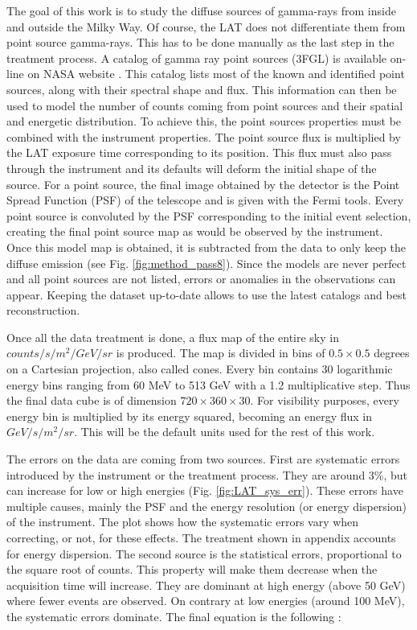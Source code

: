 The goal of this work is to study the diffuse sources of gamma-rays from inside and outside the Milky Way. Of course, the LAT does not differentiate them from point source gamma-rays. This has to be done manually as the last step in the treatment process. A catalog of gamma ray point sources (3FGL) is available on-line on NASA website \cite{3FGL2015}. This catalog lists most of the known and identified point sources, along with their spectral shape and flux. This information can then be used to model the number of counts coming from point sources and their spatial and energetic distribution. To achieve this, the point sources properties must be combined with the instrument properties. The point source flux is multiplied by the LAT exposure time corresponding to its position. This flux must also pass through the instrument and its defaults will deform the initial shape of the source. For a point source, the final image obtained by the detector is the Point Spread Function (PSF) of the telescope and is given with the Fermi tools. Every point source is convoluted by the PSF corresponding to the initial event selection, creating the final point source map as would be observed by the instrument.
Once this model map is obtained, it is subtracted from the data to only keep the diffuse emission (see Fig. \ref{fig:method_pass8}). Since the models are never perfect and all point sources are not listed, errors or anomalies in the observations can appear. Keeping the dataset up-to-date allows to use the latest catalogs and best reconstruction.


Once all the data treatment is done, a flux map of the entire sky in $counts/s/m^2/GeV/sr$ is produced. The map is divided in bins of $0.5 \times 0.5$ degrees on a Cartesian projection, also called cones. Every bin contains 30 logarithmic energy bins ranging from 60 MeV to 513 GeV with a 1.2 multiplicative step. Thus the final data cube is of dimension $720 \times 360 \times 30$. For visibility purposes, every energy bin is multiplied by its energy squared, becoming an energy flux in $GeV/s/m^2/sr$. This will be the default units used for the rest of this work.

The errors on the data are coming from two sources. First are systematic errors introduced by the instrument or the treatment process. They are around 3\%, but can increase for low or high energies (Fig. \ref{fig:LAT_sys_err}). These errors have multiple causes, mainly the PSF and the energy resolution (or energy dispersion) of the instrument. The plot shows how the systematic errors vary when correcting, or not, for these effects. The treatment shown in appendix accounts for energy dispersion.
The second source is the statistical errors, proportional to the square root of counts. This property will make them decrease when the acquisition time will increase. They are dominant at high energy (above 50 GeV) where fewer events are observed. On contrary at low energies (around 100 MeV), the systematic errors dominate. The final equation is the following :

